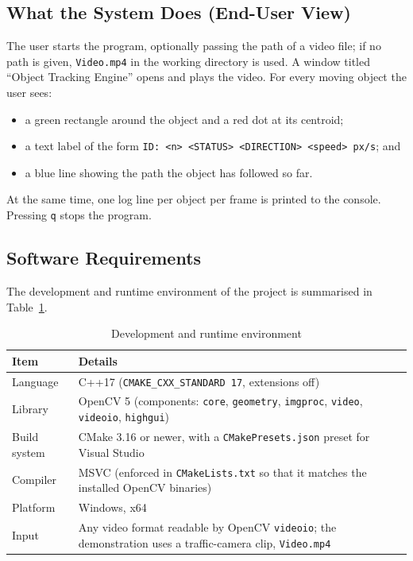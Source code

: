 \documentclass[12pt,a4paper,oneside]{book}
\begin{document}
\subsection{What the System Does (End-User View)}
The user starts the program, optionally passing the path of a video file; if no path is given, \texttt{Video.mp4} in the working directory is used. A window titled ``Object Tracking Engine'' opens and plays the video. For every moving object the user sees:
\begin{itemize}
    \item a green rectangle around the object and a red dot at its centroid;
    \item a text label of the form \texttt{ID: <n> <STATUS> <DIRECTION> <speed> px/s}; and
    \item a blue line showing the path the object has followed so far.
\end{itemize}
At the same time, one log line per object per frame is printed to the console. Pressing \texttt{q} stops the program.

\subsection{Software Requirements}
The development and runtime environment of the project is summarised in Table~\ref{tab:env}.

\begin{table}[H]
\centering

\small
\begin{tabular}{@{}p{3.6cm}p{11cm}@{}}
\toprule
\textbf{Item} & \textbf{Details}\\
\midrule
Language & C++17 (\texttt{CMAKE\_CXX\_STANDARD 17}, extensions off)\\
Library & OpenCV 5 (components: \texttt{core}, \texttt{geometry}, \texttt{imgproc}, \texttt{video}, \texttt{videoio}, \texttt{highgui})\\
Build system & CMake 3.16 or newer, with a \texttt{CMakePresets.json} preset for Visual Studio\\
Compiler & MSVC (enforced in \texttt{CMakeLists.txt} so that it matches the installed OpenCV binaries)\\
Platform & Windows, x64\\
Input & Any video format readable by OpenCV \texttt{videoio}; the demonstration uses a traffic-camera clip, \texttt{Video.mp4}\\
\bottomrule
\end{tabular}
\caption{Development and runtime environment}
\label{tab:env}
\end{table}
\end{document}
